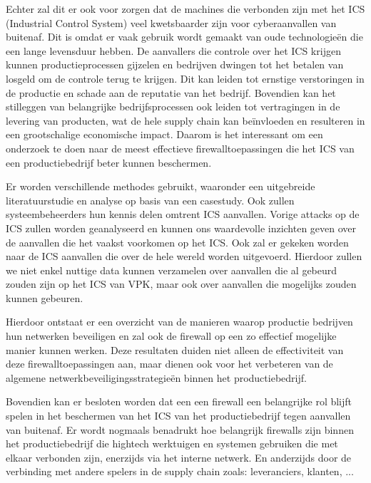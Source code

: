 Echter zal dit er ook voor zorgen dat de machines die verbonden zijn met het ICS (Industrial Control System) veel kwetsbaarder zijn voor cyberaanvallen van buitenaf. Dit is omdat er vaak gebruik wordt gemaakt van oude technologieën die een lange levensduur hebben. De aanvallers die controle over het ICS krijgen kunnen productieprocessen gijzelen en bedrijven dwingen tot het betalen van losgeld om de controle terug te krijgen. Dit kan leiden tot ernstige verstoringen in de productie en schade aan de reputatie van het bedrijf. Bovendien kan het stilleggen van belangrijke bedrijfsprocessen ook leiden tot vertragingen in de levering van producten, wat de hele supply chain kan beïnvloeden en resulteren in een grootschalige economische impact. Daarom is het interessant om een onderzoek te doen naar de meest effectieve firewalltoepassingen die het ICS van een productiebedrijf beter kunnen beschermen. 

Er worden verschillende methodes gebruikt, waaronder een uitgebreide literatuurstudie en analyse op basis van een casestudy. Ook zullen systeembeheerders hun kennis delen omtrent ICS aanvallen. Vorige attacks op de ICS zullen worden geanalyseerd en kunnen ons waardevolle inzichten geven over de aanvallen die het vaakst voorkomen op het ICS. Ook zal er gekeken worden naar de ICS aanvallen die over de hele wereld worden uitgevoerd. Hierdoor zullen we niet enkel nuttige data kunnen verzamelen over aanvallen die al gebeurd zouden zijn op het ICS van VPK, maar ook over aanvallen die mogelijks zouden kunnen gebeuren.

Hierdoor ontstaat er een overzicht van de manieren waarop productie bedrijven hun netwerken beveiligen en zal ook de firewall op een zo effectief mogelijke manier kunnen werken. Deze resultaten duiden niet alleen de effectiviteit van deze firewalltoepassingen aan, maar dienen ook voor het verbeteren van de algemene netwerkbeveiligingsstrategieën binnen het productiebedrijf.

Bovendien kan er besloten worden dat een een firewall een belangrijke rol blijft spelen in het beschermen van het ICS van het productiebedrijf tegen aanvallen van buitenaf. Er wordt nogmaals benadrukt hoe belangrijk firewalls zijn binnen het productiebedrijf die hightech werktuigen en systemen gebruiken die met elkaar verbonden zijn, enerzijds via het interne netwerk. En anderzijds door de verbinding met andere spelers in de supply chain zoals: leveranciers, klanten, ...
